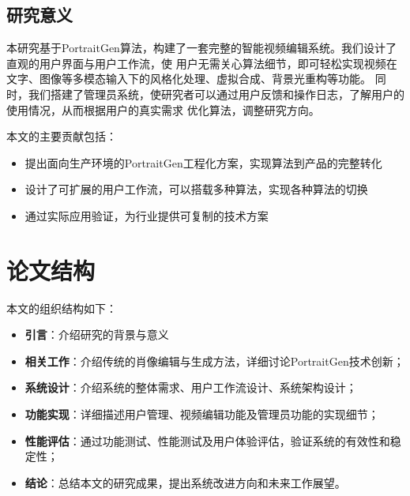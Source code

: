 \subsection{研究意义}

本研究基于PortraitGen算法，构建了一套完整的智能视频编辑系统。我们设计了直观的用户界面与用户工作流，使
用户无需关心算法细节，即可轻松实现视频在文字、图像等多模态输入下的风格化处理、虚拟合成、背景光重构等功能。
同时，我们搭建了管理员系统，使研究者可以通过用户反馈和操作日志，了解用户的使用情况，从而根据用户的真实需求
优化算法，调整研究方向。

本文的主要贡献包括：
\begin{itemize}
    \item 提出面向生产环境的PortraitGen工程化方案，实现算法到产品的完整转化
    \item 设计了可扩展的用户工作流，可以搭载多种算法，实现各种算法的切换
    \item 通过实际应用验证，为行业提供可复制的技术方案
\end{itemize}

\section{论文结构}

本文的组织结构如下：
\begin{itemize}
    \item \textbf{引言}：介绍研究的背景与意义
    \item \textbf{相关工作}：介绍传统的肖像编辑与生成方法，详细讨论PortraitGen技术创新；
    \item \textbf{系统设计}：介绍系统的整体需求、用户工作流设计、系统架构设计；
    \item \textbf{功能实现}：详细描述用户管理、视频编辑功能及管理员功能的实现细节；
    \item \textbf{性能评估}：通过功能测试、性能测试及用户体验评估，验证系统的有效性和稳定性；
    \item \textbf{结论}：总结本文的研究成果，提出系统改进方向和未来工作展望。
\end{itemize}

